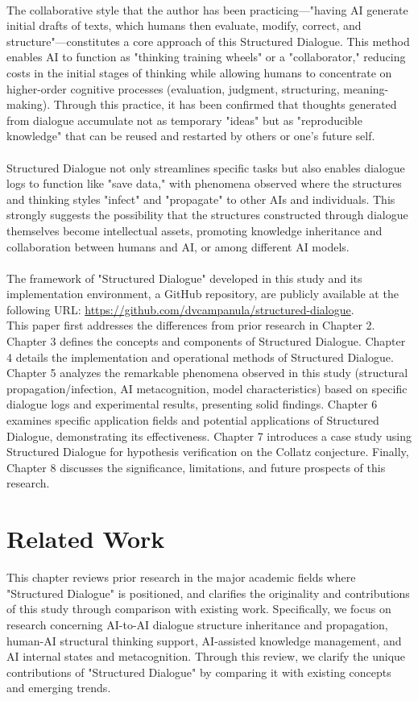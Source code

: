 \documentclass[11pt]{article}
\begin{document}
\\
The collaborative style that the author has been practicing—"having AI generate initial drafts of texts, which humans then evaluate, modify, correct, and structure"—constitutes a core approach of this Structured Dialogue. This method enables AI to function as "thinking training wheels" or a "collaborator," reducing costs in the initial stages of thinking while allowing humans to concentrate on higher-order cognitive processes (evaluation, judgment, structuring, meaning-making). Through this practice, it has been confirmed that thoughts generated from dialogue accumulate not as temporary "ideas" but as "reproducible knowledge" that can be reused and restarted by others or one's future self. \\
\\
Structured Dialogue not only streamlines specific tasks but also enables dialogue logs to function like "save data," with phenomena observed where the structures and thinking styles "infect" and "propagate" to other AIs and individuals. This strongly suggests the possibility that the structures constructed through dialogue themselves become intellectual assets, promoting knowledge inheritance and collaboration between humans and AI, or among different AI models. \\
\\
The framework of "Structured Dialogue" developed in this study and its implementation environment, a GitHub repository, are publicly available at the following URL: \url{https://github.com/dvcampanula/structured-dialogue}. \\
This paper first addresses the differences from prior research in Chapter 2. Chapter 3 defines the concepts and components of Structured Dialogue. Chapter 4 details the implementation and operational methods of Structured Dialogue. Chapter 5 analyzes the remarkable phenomena observed in this study (structural propagation/infection, AI metacognition, model characteristics) based on specific dialogue logs and experimental results, presenting solid findings. Chapter 6 examines specific application fields and potential applications of Structured Dialogue, demonstrating its effectiveness. Chapter 7 introduces a case study using Structured Dialogue for hypothesis verification on the Collatz conjecture. Finally, Chapter 8 discusses the significance, limitations, and future prospects of this research. \\
\section{Related Work}
This chapter reviews prior research in the major academic fields where "Structured Dialogue" is positioned, and clarifies the originality and contributions of this study through comparison with existing work. Specifically, we focus on research concerning AI-to-AI dialogue structure inheritance and propagation, human-AI structural thinking support, AI-assisted knowledge management, and AI internal states and metacognition. Through this review, we clarify the unique contributions of "Structured Dialogue" by comparing it with existing concepts and emerging trends.
\end{document}
